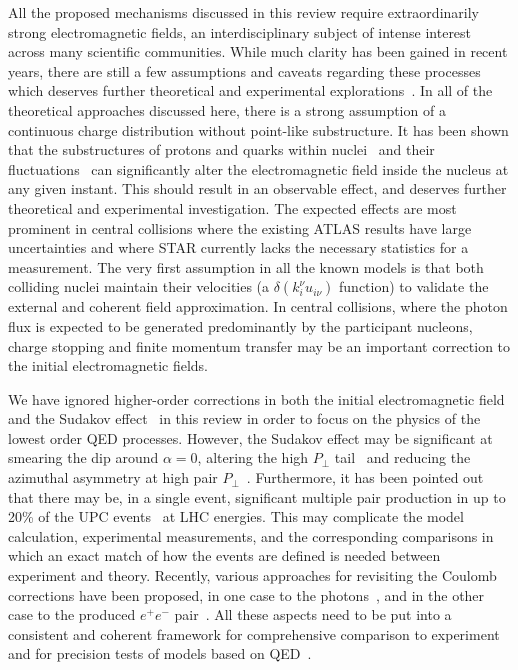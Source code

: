 \documentclass[twocolumn,epjc3]{svjour3}\sloppy
\begin{document}
All the proposed mechanisms discussed in this review require extraordinarily strong electromagnetic fields, an interdisciplinary subject of intense interest across many scientific communities. While much clarity has been gained in recent years, there are still a few assumptions and caveats regarding these processes which deserves further theoretical and experimental explorations~\cite{zhaInitialTransversemomentumBroadening2020b}.  In all of the theoretical approaches discussed here, there is a strong assumption of a continuous charge distribution without point-like substructure. It has been shown that the substructures of protons and quarks within nuclei~\cite{Staig:2010by} and their fluctuations~\cite{Bzdak:2011yy} can significantly alter the electromagnetic field inside the nucleus at any given instant. This should result in an observable effect, and deserves further theoretical and experimental investigation. The expected effects are most prominent in central collisions where the existing ATLAS results have large uncertainties and where STAR currently lacks the necessary statistics for a measurement. 
The very first assumption in all the known models is that both colliding nuclei maintain their velocities (a $\delta(k_{i}^{\nu}u_{i\nu})$ function) to validate the external and coherent field approximation. In central collisions, where the photon flux is expected to be generated predominantly by the participant nucleons, charge stopping and finite momentum transfer may be an important correction to the initial electromagnetic fields. 

We have ignored higher-order corrections in both the initial electromagnetic field~\cite{PhysRevC.70.031902} and the Sudakov effect~\cite{Klein:2018fmp} in this review in order to focus on the physics of the lowest order QED processes. However, the Sudakov effect may be significant at smearing the dip around $\alpha=0$, altering the high $P_{\perp}$ tail~\cite{Klein:2018fmp} and reducing the azimuthal asymmetry at high pair $P_{\perp}$~\cite{liImpactParameterDependence2020}. Furthermore, it has been pointed out that there may be, in a single event, significant multiple pair production in up to 20\% of the UPC events~\cite{Hencken:2004td} at LHC energies. This may complicate the model calculation, experimental measurements, and the corresponding comparisons in which an exact match of how the events are defined is needed between experiment and theory. Recently, various approaches for revisiting the Coulomb corrections have been proposed, in one case to the photons~\cite{Zha:2021jhf}, and in the other case to the produced $e^+e^-$ pair~\cite{Sun:2020ygb}. All these aspects need to be put into a consistent and coherent framework for comprehensive comparison to experiment and for precision tests of models based on QED~\cite{klusek-gawendaCentralityDependenceDilepton2021,Wang:2021kxm}.
\end{document}
